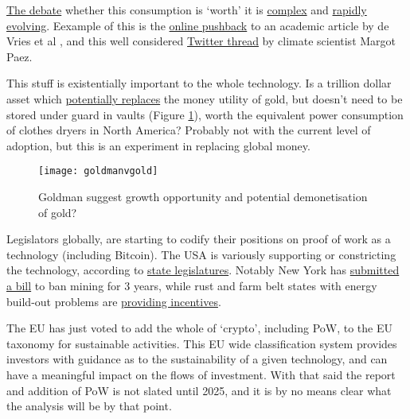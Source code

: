 \href{https://www.youtube.com/watch?v=6LP8G-oZnEs}{The debate} whether this consumption is `worth' it is \href{https://www.utilitydive.com/news/bitcoin-mining-as-a-grid-resource-its-complicated/617896/}{complex} and \href{https://www.aei.org/technology-and-innovation/no-hearing-on-bitcoins-energy-use-is-complete-without-nic-carter/}{rapidly evolving}. Eexample of this is the \href{https://www.zerohedge.com/crypto/questionable-ethics-anti-bitcoin-esg-junk-science}{online pushback} to an academic article by de Vries et al \cite{de2022revisiting}, and this well considered \href{https://twitter.com/jyn_urso/status/1508899761319038983}{Twitter thread} by climate scientist Margot Paez.\par 
This stuff is existentially important to the whole technology. Is a trillion dollar asset which \href{https://www.theheldreport.com/p/bitcoin-vs-gold}{potentially replaces} the money utility of gold, but doesn't need to be stored under guard in vaults (Figure \ref{fig:goldmanVgold}), worth the equivalent power consumption of clothes dryers in North America? Probably not with the current level of adoption, but this is an experiment in replacing global money.\par
\begin{figure}
  \centering
    \texttt{[image: goldmanvgold]}
  \caption{Goldman suggest growth opportunity and potential demonetisation of gold?}
  \label{fig:goldmanVgold}
\end{figure}
Legislators globally, are starting to codify their positions on proof of work as a technology (including Bitcoin). The USA is variously supporting or constricting the technology, according to \href{https://www.ncsl.org/research/financial-services-and-commerce/cryptocurrency-2021-legislation.aspx}{state legislatures}. Notably New York has \href{https://www.nysenate.gov/legislation/bills/2021/s6486}{submitted a bill} to ban mining for 3 years, while rust and farm belt states with energy build-out problems are \href{https://financialpost.com/fp-finance/cryptocurrency/texas-governor-abbott-turns-to-bitcoin-miners-to-bolster-the-grid-and-his-re-election}{providing incentives}. \par
The EU has just voted to add the whole of `crypto', including PoW, to the EU taxonomy for sustainable activities. This EU wide classification system provides investors with guidance as to the sustainability of a given technology, and can have a meaningful impact on the flows of investment. With that said the report and addition of PoW is not slated until 2025, and it is by no means clear what the analysis will be by that point.  
